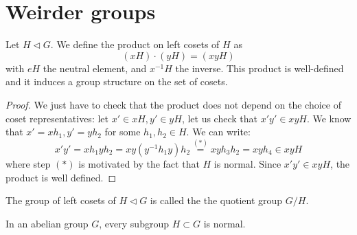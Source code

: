 \section{Weirder groups}

\begin{theorem*}
  Let $H \mathrel{\triangleleft} G$. We define the product on left cosets of $H$ as 
  \[
    (xH) \cdot (yH) = (xyH)
  \]
  with $eH$ the neutral element, and $x^{-1}H$ the inverse. This product is well-defined and it induces a group structure on the set of cosets. 
\end{theorem*}
\begin{proof}
  We just have to check that the product does not depend on the choice of coset representatives: let $x' \in xH, y' \in yH$, let us check that $x'y' \in xyH$. We know that $x' = xh_1, y' = yh_2$ for some $h_1, h_2 \in H$. We can write: 
  \[
    x'y' = xh_1yh_2 = xy(y^{-1}h_1y)h_2 \stackrel{(*)}{=} xyh_3h_2 = xyh_4 \in xyH
  \]
  where step $(*)$ is motivated by the fact that $H$ is normal. Since $x'y' \in xyH$, the product is well defined.
\end{proof}

\begin{definition}
  The group of left cosets of $H \mathrel{\triangleleft} G$ is called the the quotient group $G/H$.
\end{definition}


\begin{theorem*}
  In an abelian group $G$, every subgroup $H \subset G$ is normal. 
\end{theorem*}


